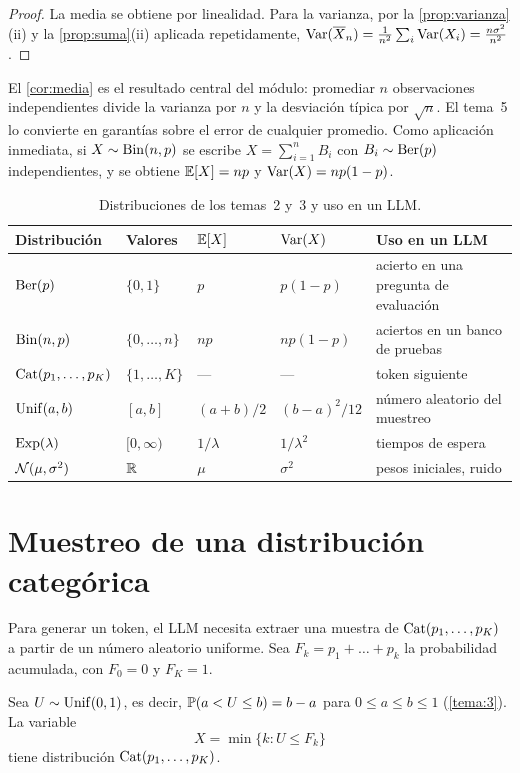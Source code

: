 \begin{proof}
La media se obtiene por linealidad. Para la varianza, por la \cref{prop:varianza}(ii) y la \cref{prop:suma}(ii) aplicada repetidamente, $\operatorname{Var}(\overline{X}_n)=\frac{1}{n^{2}}\sum_{i}\operatorname{Var}(X_i)=\frac{n\sigma^{2}}{n^{2}}$.
\end{proof}

El \cref{cor:media} es el resultado central del módulo: promediar $n$ observaciones independientes divide la varianza por $n$ y la desviación típica por $\sqrt n$. El tema~5 lo convierte en garantías sobre el error de cualquier promedio. Como aplicación inmediata, si $X\sim\operatorname{Bin}(n,p)$ se escribe $X=\sum_{i=1}^{n}B_i$ con $B_i\sim\operatorname{Ber}(p)$ independientes, y se obtiene $\mathbb{E}[X]=np$ y $\operatorname{Var}(X)=np(1-p)$.

\begin{table}[h]
\centering\small
\caption{Distribuciones de los temas~2 y~3 y uso en un LLM.}\label{tab:distribuciones}
\begin{tabular}{@{}lllll@{}}
\toprule
Distribución & Valores & $\mathbb{E}[X]$ & $\operatorname{Var}(X)$ & Uso en un LLM \\
\midrule
$\operatorname{Ber}(p)$ & $\{0,1\}$ & $p$ & $p(1-p)$ & acierto en una pregunta de evaluación \\
$\operatorname{Bin}(n,p)$ & $\{0,\dots,n\}$ & $np$ & $np(1-p)$ & aciertos en un banco de pruebas \\
$\operatorname{Cat}(p_1,\dots,p_K)$ & $\{1,\dots,K\}$ & --- & --- & token siguiente \\
$\operatorname{Unif}(a,b)$ & $[a,b]$ & $(a+b)/2$ & $(b-a)^{2}/12$ & número aleatorio del muestreo \\
$\operatorname{Exp}(\lambda)$ & $[0,\infty)$ & $1/\lambda$ & $1/\lambda^{2}$ & tiempos de espera \\
$\mathcal{N}(\mu,\sigma^{2})$ & $\mathbb{R}$ & $\mu$ & $\sigma^{2}$ & pesos iniciales, ruido \\
\bottomrule
\end{tabular}
\end{table}

\section{Muestreo de una distribución categórica}

Para generar un token, el LLM necesita extraer una muestra de $\operatorname{Cat}(p_1,\dots,p_K)$ a partir de un número aleatorio uniforme. Sea $F_k=p_1+\dots+p_k$ la probabilidad acumulada, con $F_0=0$ y $F_K=1$.

\begin{proposicion}\label{prop:inversa-discreta}
Sea $U\sim\operatorname{Unif}(0,1)$, es decir, $\mathbb{P}(a<U\le b)=b-a$ para $0\le a\le b\le 1$ (\cref{tema:3}). La variable
\[
X=\min\{k: U\le F_k\}
\]
tiene distribución $\operatorname{Cat}(p_1,\dots,p_K)$.
\end{proposicion}


